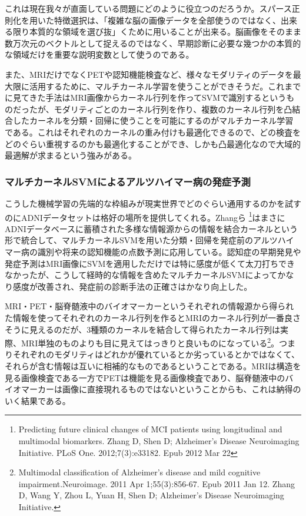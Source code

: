 これは現在我々が直面している問題にどのように役立つのだろうか。スパース正則化を用いた特徴選択は、「複雑な脳の画像データを全部使うのではなく、出来る限り本質的な領域を選び抜」くために用いることが出来る。脳画像をそのまま数万次元のベクトルとして捉えるのではなく、早期診断に必要な幾つかの本質的な領域だけを重要な説明変数として使うのである。

また、MRIだけでなくPETや認知機能検査など、様々なモダリティのデータを最大限に活用するために、マルチカーネル学習を使うことができそうだ。これまでに見てきた手法はMRI画像からカーネル行列を作ってSVMで識別するというものだったが、モダリティごとのカーネル行列を作り、複数のカーネル行列を凸結合したカーネルを分類・回帰に使うことを可能にするのがマルチカーネル学習である。これはそれぞれのカーネルの重み付けも最適化できるので、どの検査をどのぐらい重視するのかも最適化することができ、しかも凸最適化なので大域的最適解が求まるという強みがある。
\subsubsection{マルチカーネルSVMによるアルツハイマー病の発症予測}
こうした機械学習の先端的な枠組みが現実世界でどのぐらい通用するのかを試すのにADNIデータセットは格好の場所を提供してくれる。Zhangら
\footnote{
Predicting future clinical changes of MCI patients using longitudinal and multimodal biomarkers. Zhang D, Shen D; Alzheimer's Disease Neuroimaging Initiative. PLoS One. 2012;7(3):e33182. Epub 2012 Mar 22}はまさにADNIデータベースに蓄積された多様な情報源からの情報を結合カーネルという形で統合して、マルチカーネルSVMを用いた分類・回帰を発症前のアルツハイマー病の識別や将来の認知機能の点数予測に応用している。認知症の早期発見や発症予測はMRI画像にSVMを適用しただけでは特に感度が低くて太刀打ちできなかったが、こうして経時的な情報を含めたマルチカーネルSVMによってかなり感度が改善され、発症前の診断手法の正確さはかなり向上した。

MRI・PET・脳脊髄液中のバイオマーカーというそれぞれの情報源から得られた情報を使ってそれぞれのカーネル行列を作るとMRIのカーネル行列が一番良さそうに見えるのだが、3種類のカーネルを結合して得られたカーネル行列は実際、MRI単独のものよりも目に見えてはっきりと良いものになっている\footnote{Multimodal classification of Alzheimer's disease and mild cognitive impairment.Neuroimage. 2011 Apr 1;55(3):856-67. Epub 2011 Jan 12. Zhang D, Wang Y, Zhou L, Yuan H, Shen D; Alzheimer's Disease Neuroimaging Initiative.}。つまりそれぞれのモダリティはどれかが優れているとか劣っているとかではなくて、それらが含む情報は互いに相補的なものであるということである。MRIは構造を見る画像検査である一方でPETは機能を見る画像検査であり、脳脊髄液中のバイオマーカーは画像に直接現れるものではないということからも、これは納得のいく結果である。

